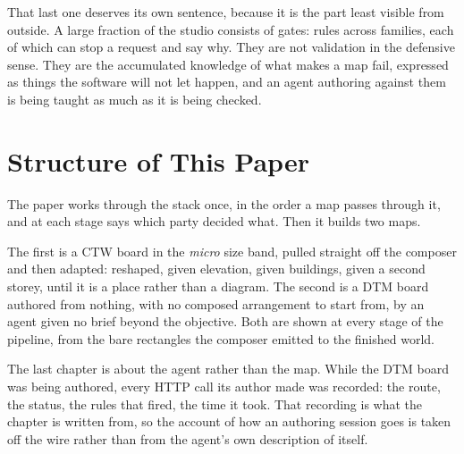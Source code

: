 That last one deserves its own sentence, because it is the part least visible from
outside. A large fraction of the studio consists of gates: \RuleCount{} rules
across \RuleFamilyCount{} families, each of which can stop a request and say why.
They are not validation in the defensive sense. They are the accumulated knowledge
of what makes a map fail, expressed as things the software will not let happen, and
an agent authoring against them is being taught as much as it is being checked.

\section{Structure of This Paper}

The paper works through the stack once, in the order a map passes through it, and
at each stage says which party decided what. Then it builds two maps.

The first is a CTW board in the \emph{micro} size band, pulled straight off the
composer and then adapted: reshaped, given elevation, given buildings, given a
second storey, until it is a place rather than a diagram. The second is a DTM
board authored from nothing, with no composed arrangement to start from, by an
agent given no brief beyond the objective. Both are shown at every stage of the
pipeline, from the bare rectangles the composer emitted to the finished world.

The last chapter is about the agent rather than the map. While the DTM board was
being authored, every HTTP call its author made was recorded: the route, the
status, the rules that fired, the time it took. That recording is what the chapter
is written from, so the account of how an authoring session goes is taken off the
wire rather than from the agent's own description of itself.
